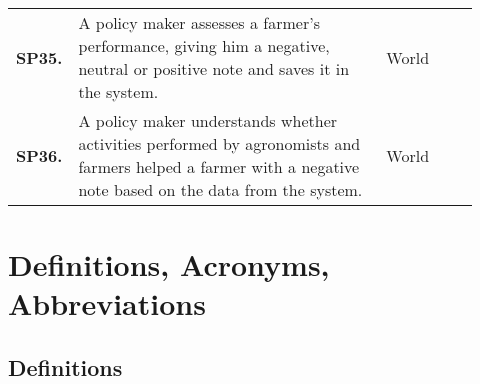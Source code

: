 \begin{longtable}{@{}p{0.06\linewidth} p{0.66\linewidth} p{0.20\linewidth}@{}}
    \textbf{SP35.} & A policy maker assesses a farmer's performance, giving him a negative, neutral or positive note and saves it in the system. & World \\
    \textbf{SP36.} & A policy maker understands whether activities performed by agronomists and farmers helped a farmer with a negative note based on the data from the system. & World \\
    
	\bottomrule
\end{longtable}

\section{Definitions, Acronyms, Abbreviations}

\subsection{Definitions}

